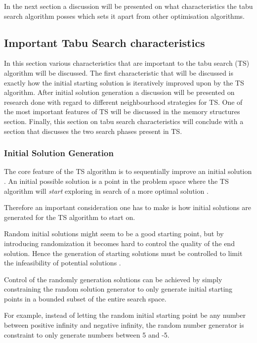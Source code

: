 In the next section a discussion will be presented on what characteristics the tabu search algorithm posses which sets it apart from other optimisation algorithms.
\subsection{Important Tabu Search characteristics}
In this section various characteristics that are important to the tabu search (TS) algorithm will be discussed. The first characteristic that will be discussed is exactly how the initial starting solution is iteratively improved upon by the TS algorithm. After initial solution generation a discussion will be presented on research done with regard to different neighbourhood strategies for TS. One of the most important features of TS will be discussed in the memory structures section. Finally, this section on tabu search characteristics will conclude with a section that discusses the two search phases present in TS.

\subsubsection{Initial Solution Generation}
The core feature of the TS algorithm is to sequentially improve an initial solution \cite{TSHazardous}. An initial possible solution is a point in the problem space where the TS algorithm will \emph{start} exploring in search of a more optimal solution \cite{AIModernApproach,TSHazardous}.

Therefore an important consideration one has to make is how initial solutions are generated for the TS algorithm to start on\cite{AIModernApproach,TSHazardous}.

Random initial solutions might seem to be a good starting point, but by introducing randomization it becomes hard to control the quality of the end solution\cite{TSHazardous}. Hence the generation of starting solutions must be controlled to limit the infeasibility of potential solutions \cite{TSHazardous}. 

Control of the randomly generation solutions can be achieved by simply constraining the random solution generator to only generate initial starting points in a bounded subset of the entire search space. 

For example, instead of letting the random initial starting point be any number between positive infinity and negative infinity, the random number generator is constraint to only generate numbers between 5 and -5.

